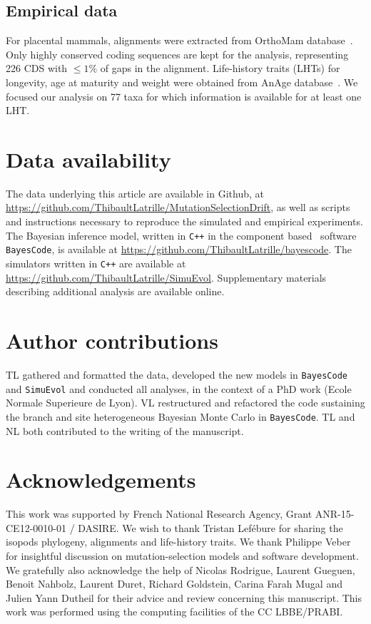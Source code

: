\documentclass{article}
\begin{document}
    \subsection{Empirical data}
    For placental mammals, alignments were extracted from OrthoMam database~\citep{Ranwez2007,Scornavacca2019}.
    Only highly conserved coding sequences are kept for the analysis, representing 226 {CDS} with $\leq 1\%$ of gaps in the alignment.
    Life-history traits ({LHT}s) for longevity, age at maturity and weight were obtained from AnAge database~\citep{DEMAGALHAES2009,Tacutu2012}.
    We focused our analysis on 77 taxa for which information is available for at least one {LHT}.

    \section{Data availability}
    The data underlying this article are available in Github, at \url{https://github.com/ThibaultLatrille/MutationSelectionDrift}, as well as scripts and instructions necessary to reproduce the simulated and empirical experiments.
    The Bayesian inference model, written in \texttt{C++} in the component based~\citep{Lanore2019} software \texttt{BayesCode}, is available at \url{https://github.com/ThibaultLatrille/bayescode}.
    The simulators written in \texttt{C++} are available at \url{https://github.com/ThibaultLatrille/SimuEvol}.
    Supplementary materials describing additional analysis are available online.

    \section{Author contributions}
    TL gathered and formatted the data, developed the new models in \texttt{BayesCode} and \texttt{SimuEvol} and conducted all analyses, in the context of a PhD work (Ecole Normale Superieure de Lyon).
    VL restructured and refactored the code sustaining the branch and site heterogeneous Bayesian Monte Carlo in \texttt{BayesCode}.
    TL and NL both contributed to the writing of the manuscript.

    \section{Acknowledgements}
    This work was supported by French National Research Agency, Grant ANR-15-CE12-0010-01 / DASIRE.
    We wish to thank Tristan Lefébure for sharing the isopods phylogeny, alignments and life-history traits.
    We thank Philippe Veber for insightful discussion on mutation-selection models and software development.
    We gratefully also acknowledge the help of Nicolas Rodrigue, Laurent Gueguen, Benoit Nahbolz, Laurent Duret, Richard Goldstein, Carina Farah Mugal and Julien Yann Dutheil for their advice and review concerning this manuscript.
    This work was performed using the computing facilities of the CC LBBE/PRABI.

    
\end{document}
